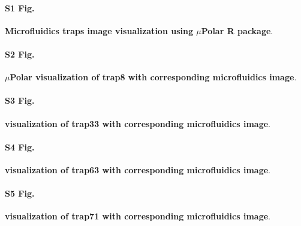 \documentclass[conference]{IEEEtran}
\begin{document}
\paragraph*{S1 Fig.}
\label{S1_Fig}
{\bf  Microfluidics traps image visualization using $\mu$Polar R package}. 


\paragraph*{S2 Fig.}
\label{S2_Fig}
{\bf  $\mu$Polar visualization of trap8 with corresponding microfluidics image}. 


\paragraph*{S3 Fig.}
\label{S3_Fig}
{\bf  visualization of trap33 with corresponding microfluidics image}. 



\paragraph*{S4 Fig.}
\label{S4_Fig}
{\bf visualization of trap63 with corresponding microfluidics image}. 






\paragraph*{S5 Fig.}
\label{S5_Fig}
{\bf  visualization of trap71 with corresponding microfluidics image}. 

\end{document}
